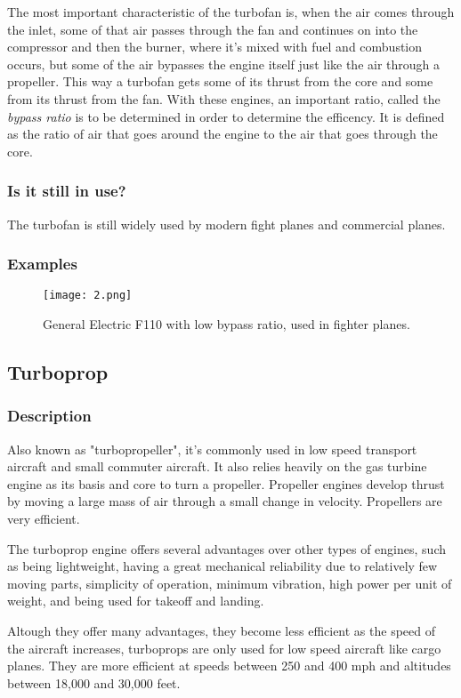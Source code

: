 \documentclass[12pt, letterpaper]{article}
\begin{document}
The most important characteristic of the turbofan is, when the air comes through the inlet, some of that air passes through the fan and continues on into the compressor and then the burner, where it's mixed with fuel and combustion occurs, but some of the air bypasses the engine itself just like the air through a propeller. This way a turbofan gets some of its thrust from the core and some from its thrust from the fan. With these engines, an important ratio, called the \textit{bypass ratio} is to be determined in order to determine the efficency. It is defined as the ratio of air that goes around the engine to the air that goes through the core. \autocite{nasa00}
\subsubsection*{Is it still in use?}
The turbofan is still widely used by modern fight planes and commercial planes.
\subsubsection*{Examples}
\begin{figure}[H]
	\centering
	\texttt{[image: 2.png]}
	\caption{General Electric F110 with low bypass ratio, used in fighter planes.}
\end{figure}

\subsection*{Turboprop}
\subsubsection*{Description}
Also known as "turbopropeller", it's commonly used in low speed transport aircraft and small commuter aircraft. It also relies heavily on the gas turbine engine as its basis and core to turn a propeller. Propeller engines develop thrust by moving a large mass of air through a small change in velocity. Propellers are very efficient.

The turboprop engine offers several advantages over other types of engines, such as being lightweight, having a great mechanical reliability due to relatively few moving parts, simplicity of operation, minimum vibration, high power per unit of weight, and being used for takeoff and landing.

Altough they offer many advantages, they become less efficient as the speed of the aircraft increases, turboprops are only used for low speed aircraft like cargo planes. They are more efficient at speeds between 250 and 400 mph and altitudes between 18,000 and 30,000 feet. \autocite{nasa01} \autocite{faa17}
\end{document}

